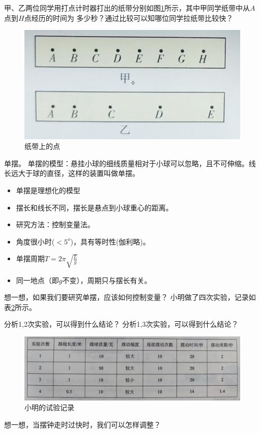 \documentclass[windows,csize4]{BHCexam}
\begin{document}
\begin{groups}
\question[5] 甲、乙两位同学用打点计时器打出的纸带分别如图\ref{fig:fig_1_15}所示，其中甲同学纸带中从$A$ 点到$H$点经历的时间为
多少秒？通过比较可以知哪位同学拉纸带比较快？
\begin{figure}[htb]
    \centering
    \includegraphics [scale=0.5,trim=0 0 0 0]{./image/fig_1_15.PNG}
    \caption{纸带上的点} 
    \label{fig:fig_1_15}
\end{figure}

单摆。
单摆的模型：悬挂小球的细线质量相对于小球可以忽略，且不可伸缩。线长远大于球的直径，这样的装置叫做单摆。
\begin{itemize}
    \item 单摆是理想化的模型
    \item 摆长和线长不同，摆长是悬点到小球重心的距离。
    \item 研究方法：控制变量法。
\end{itemize}

\begin{itemize}
    \item 角度很小时($<5^o$)，具有等时性(伽利略)。
    \item 单摆周期$T=2\pi \sqrt{\frac{L}{g}}$
    \item 同一地点（即$g$不变），周期只与摆长有关。
\end{itemize}

想一想，如果我们要研究单摆，应该如何控制变量？ 
\question[5] 小明做了四次实验，记录如表\ref{fig:fig_1_16}所示。
\begin{subquestions}
    \subquestion 分析1,2次实验，可以得到什么结论？
    \subquestion 分析1,3次实验，可以得到什么结论？
\end{subquestions}
\begin{figure}[htb]
    \centering
    \includegraphics [scale=0.3,trim=0 0 0 0]{./image/fig_1_16.PNG}
    \caption{小明的试验记录} 
    \label{fig:fig_1_16}
\end{figure}
想一想，当摆钟走时过快时，我们可以怎样调整？


\end{groups}

\label{lastpage}
\end{document}
